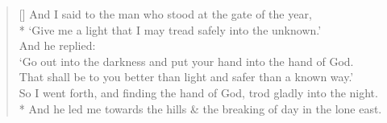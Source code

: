 \documentclass[MAIN]{subfiles}
\begin{document}
\settowidth{\versewidth}{So I went forth, and finding the hand of God, trod gladly into the night.}
\begin{verse}[\versewidth]
And I said to the man who stood at the gate of the year,\\*
`Give me a light that I may tread safely into the unknown.'\\
And he replied:\\
`Go out into the darkness and put your hand into the hand of God.\\
That shall be to you better than light and safer than a known way.'\\
So I went forth, and finding the hand of God, trod gladly into the night.\\*
And he led me towards the hills \& the breaking of day in the lone east.
\end{verse}
\end{document}
